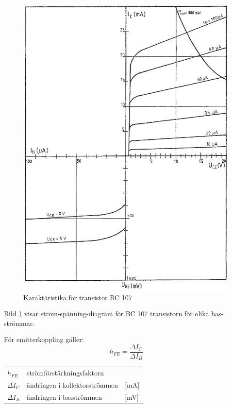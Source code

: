 \begin{figure}
\includegraphics[width=\textwidth]{images/cropped_pdfs/bild_2_2-19.pdf}
\caption{Karaktäristika för transistor BC 107}
\label{fig:BildII2-19}
\end{figure}

Bild \ref{fig:BildII2-19} visar ström-spänning-diagram för BC 107 transistorn
för olika bas-strömmar.

För emitterkoppling gäller:
\[ h_{FE} = \frac{\Delta I_C}{\Delta I_B} \]

\begin{tabular}{lll}
	\(h_{FE}\)     & strömförstärkningsfaktorn     &  \\
	\(\Delta I_C\) & ändringen i kollektorströmmen & [mA] \\
	\(\Delta I_B\) & ändringen i basströmmen       & [mV]
\end{tabular}

